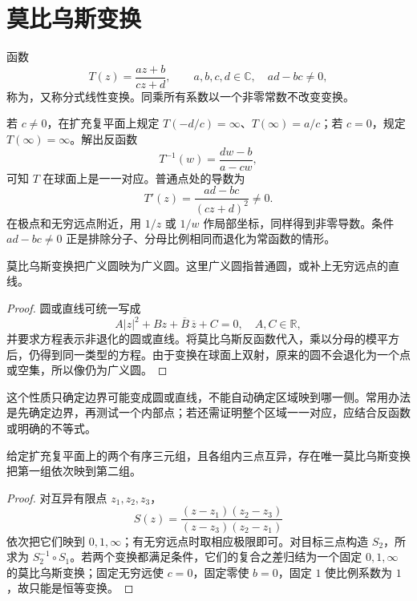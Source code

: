 \documentclass[UTF8,12pt,a4paper,fontset=fandol]{ctexbook}
\begin{document}
\section{莫比乌斯变换}

\begin{definition}[莫比乌斯变换]
函数
\begin{equation}
 T(z)=\frac{az+b}{cz+d},\qquad a,b,c,d\in\mathbb C,\quad ad-bc\ne0,
 \label{eq:cv-mobius}
\end{equation}
称为，又称分式线性变换。同乘所有系数以一个非零常数不改变变换。
\end{definition}

若 $c\ne0$，在扩充复平面上规定 $T(-d/c)=\infty$、$T(\infty)=a/c$；若 $c=0$，规定 $T(\infty)=\infty$。解出反函数
\[
 T^{-1}(w)=\frac{dw-b}{a-cw},
\]
可知 $T$ 在球面上是一一对应。普通点处的导数为
\[
 T'(z)=\frac{ad-bc}{(cz+d)^2}\ne0.
\]
在极点和无穷远点附近，用 $1/z$ 或 $1/w$ 作局部坐标，同样得到非零导数。条件 $ad-bc\ne0$ 正是排除分子、分母比例相同而退化为常函数的情形。

\begin{proposition}[广义圆的保持性]
莫比乌斯变换把广义圆映为广义圆。这里广义圆指普通圆，或补上无穷远点的直线。
\end{proposition}
\begin{proof}
圆或直线可统一写成
\[
 A|z|^2+Bz+\overline B\,\overline z+C=0,
 \quad A,C\in\mathbb R,
\]
并要求方程表示非退化的圆或直线。将莫比乌斯反函数代入，乘以分母的模平方后，仍得到同一类型的方程。由于变换在球面上双射，原来的圆不会退化为一个点或空集，所以像仍为广义圆。
\end{proof}

这个性质只确定边界可能变成圆或直线，不能自动确定区域映到哪一侧。常用办法是先确定边界，再测试一个内部点；若还需证明整个区域一一对应，应结合反函数或明确的不等式。

\begin{proposition}[三点确定变换]
给定扩充复平面上的两个有序三元组，且各组内三点互异，存在唯一莫比乌斯变换把第一组依次映到第二组。
\end{proposition}
\begin{proof}
对互异有限点 $z_1,z_2,z_3$，
\[
 S(z)=\frac{(z-z_1)(z_2-z_3)}{(z-z_3)(z_2-z_1)}
\]
依次把它们映到 $0,1,\infty$；有无穷远点时取相应极限即可。对目标三点构造 $S_2$，所求为 $S_2^{-1}\circ S_1$。若两个变换都满足条件，它们的复合之差归结为一个固定 $0,1,\infty$ 的莫比乌斯变换；固定无穷远使 $c=0$，固定零使 $b=0$，固定 $1$ 使比例系数为 $1$，故只能是恒等变换。
\end{proof}
\end{document}
